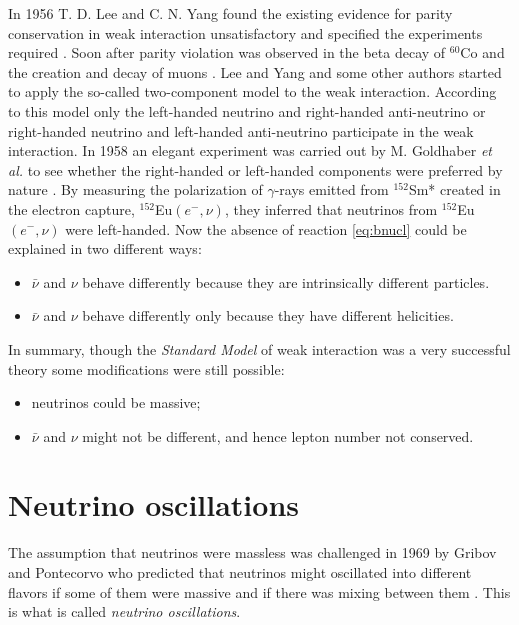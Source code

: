 In 1956 T. D. Lee and C. N. Yang found the existing evidence for parity conservation in weak interaction unsatisfactory and specified the experiments required \cite{Lee56}. Soon after parity violation was observed in the beta decay of $^{60}$Co \cite{Wu57} and the creation and decay of muons \cite{Gar57,Fri57}. Lee and Yang \cite{Lee57} and some other authors \cite{Sal57, Lan57} started to apply the so-called two-component model \cite{Wey29} to the weak interaction. According to this model only the left-handed neutrino and right-handed anti-neutrino or right-handed neutrino and left-handed anti-neutrino participate in the weak interaction. In 1958 an elegant experiment was carried out by M. Goldhaber \textit{et al.} to see whether the right-handed or left-handed components were preferred by nature \cite{Gol58}. By measuring the polarization of $\gamma$-rays emitted from $^{152}$Sm* created in the electron capture, $^{152}$Eu$(e^-,\nu)$, they inferred that neutrinos from $^{152}$Eu$(e^-,\nu)$ were left-handed. Now the absence of reaction \ref{eq:bnucl} could be explained in two different ways:
\begin{itemize}
\item $\bar{\nu}$ and $\nu$ behave differently because they are intrinsically different particles.
\item $\bar{\nu}$ and $\nu$ behave differently only because they have different helicities.
\end{itemize}

In summary, though the \emph{Standard Model} of weak interaction was a very successful theory some modifications were still possible:
\begin{itemize}
\item neutrinos could be massive;
\item $\bar{\nu}$ and $\nu$ might not be different, and hence lepton number not conserved.
\end{itemize}


\section{Neutrino oscillations}
\label{sec:osci}
The assumption that neutrinos were massless was challenged in 1969 by Gribov and Pontecorvo who predicted that neutrinos might oscillated into different flavors if some of them were massive and if there was mixing between them \cite{Gri69}. This is what is called \emph{neutrino oscillations}.

